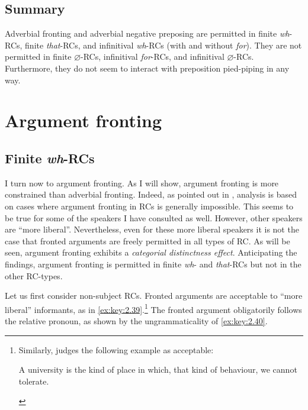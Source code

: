 \documentclass[output=paper]{langsci/langscibook}
\begin{document}
\label{ex:key:2.37}
\z

\label{ex:key:2.38}
\z

\subsection{Summary}

Adverbial fronting and adverbial negative preposing are permitted in finite
\emph{wh}{-RCs, finite} \emph{that}{-RCs, and infinitival} \emph{wh}{-\glspl{RC} (with
and without} \emph{for}). They are not permitted in finite $\varnothing${-RCs,
infinitival} \emph{for}{-RCs, and infinitival} $\varnothing${-RCs. Furthermore,}
they do not seem to interact with preposition pied-piping in any way.

\section{Argument fronting}\label{sec:key:02.3}

\subsection{Finite \emph{wh}-RCs}

I turn now to argument fronting. As I will show, argument fronting is more
constrained than adverbial fronting. Indeed, as pointed
out in ,  analysis is based on cases where
argument fronting in \glspl{RC} is generally impossible.
This seems to be true for some of the speakers I have consulted as well.
However, other speakers are \enquote{more liberal}. Nevertheless, even for
these more liberal speakers it is not the case that fronted arguments are freely permitted in all types of \gls{RC}. As
will be seen, argument fronting exhibits a \emph{categorial distinctness
    effect}. Anticipating the findings, argument fronting is permitted in
    finite \emph{wh}- and \emph{that}-\glspl{RC} but not in the other
    RC-types.%

Let us first consider non-subject \glspl{RC}. Fronted arguments are acceptable
to \enquote{more liberal} informants, as in
\eqref{ex:key:2.39}.\footnote{Similarly, \textcite[282]{Radford2009} judges the
    following example as acceptable:

\begin{exe}
      A university is the kind of place in which, that kind of behaviour, we cannot tolerate.
\end{exe}} The fronted argument
obligatorily follows the relative pronoun, as shown by the ungrammaticality of
\eqref{ex:key:2.40}.
\end{document}
